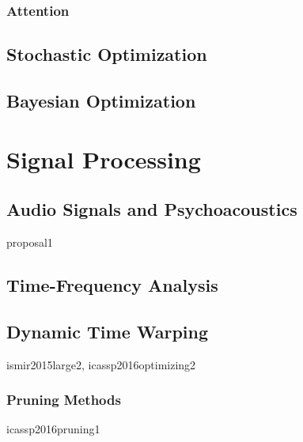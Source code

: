 \subsubsection{Attention}

\subsection{Stochastic Optimization}

\subsection{Bayesian Optimization}

\section{Signal Processing}

\subsection{Audio Signals and Psychoacoustics}

proposal1

\subsection{Time-Frequency Analysis}

\subsection{Dynamic Time Warping}

ismir2015large2, icassp2016optimizing2

\subsubsection{Pruning Methods}

icassp2016pruning1

